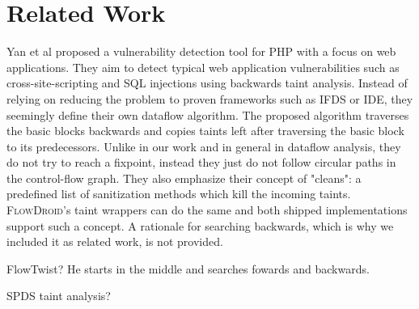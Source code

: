 \documentclass[../draft.tex]{subfiles}
\begin{document}
    \chapter{Related Work}
    Yan et al \cite{Yan2017} proposed a vulnerability detection tool for PHP with a focus on web applications. They aim to detect typical web application vulnerabilities such as cross-site-scripting and SQL injections using backwards taint analysis. 
    Instead of relying on reducing the problem to proven frameworks such as IFDS or IDE, they seemingly define their own dataflow algorithm. The proposed algorithm traverses the basic blocks backwards and copies taints left after traversing the basic block to its predecessors. Unlike in our work and in general in dataflow analysis, they do not try to reach a fixpoint, instead they just do not follow circular paths in the control-flow graph. 
    They also emphasize their concept of "cleans": a predefined list of sanitization methods which kill the incoming taints. 
    \textsc{FlowDroid}'s taint wrappers can do the same and both shipped implementations support such a concept.
    A rationale for searching backwards, which is why we included it as related work, is not provided.

    FlowTwist? He starts in the middle and searches fowards and backwards.

    SPDS taint analysis?
\end{document}
